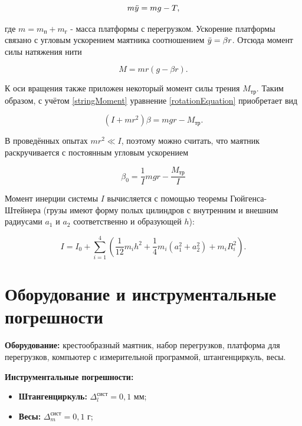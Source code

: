 \documentclass[a4paper,12pt]{article} %
\begin{document}
\begin{equation}
    m\Ddot{y} = mg - T,
\end{equation}

где $ m = m_\text{п} + m_\text{г} $ - масса платформы с перегрузком. Ускорение платформы связано с угловым ускорением маятника соотношением $ \Ddot{y} = \beta r $. Отсюда момент силы натяжения нити

\begin{equation}
    M = mr(g - \beta r).
    \label{stringMoment}
\end{equation}

К оси вращения также приложен некоторый момент силы трения $ M_\text{тр} $. Таким образом, с учётом \eqref{stringMoment} уравнение \eqref{rotationEquation} приобретает вид

\begin{equation}
    (I + mr^2)\beta = mgr - M_\text{тр}.
\end{equation}

В проведённых опытах $ mr^2 \ll I $, поэтому можно считать, что маятник раскручивается с постоянным угловым ускорением 

\begin{equation}
    \beta_0 = \frac{1}{I}mgr - \frac{M_\text{тр}}{I}
    \label{mainEq}
\end{equation}

Момент инерции системы $ I $ вычисляется с помощью теоремы Гюйгенса-Штейнера (грузы имеют форму полых цилиндров с внутренним и внешним радиусами $ a_1 $ и $ a_2 $ соответственно и образующей $ h $):

\begin{equation}
    I = I_0 + \sum\limits_{i = 1}^4{(\dfrac{1}{12}m_ih^2 + \dfrac{1}{4}m_i(a_1^2 + a_2^2) + m_iR_i^2)}.
    \label{inertiaMoment}
\end{equation}

\section{Оборудование и инструментальные погрешности}

\textbf{Оборудование:} крестообразный маятник, набор перегрузков, платформа для перегрузков, компьютер с измерительной программой, штангенциркуль, весы.

\textbf{Инструментальные погрешности:}

\begin{itemize}
    \item \textbf{Штангенциркуль:} $ \Delta_l^\text{сист} = 0,1 $ мм;
    \item \textbf{Весы:} $ \Delta_m^\text{сист} = 0,1 $ г;
\end{itemize}
\end{document}
